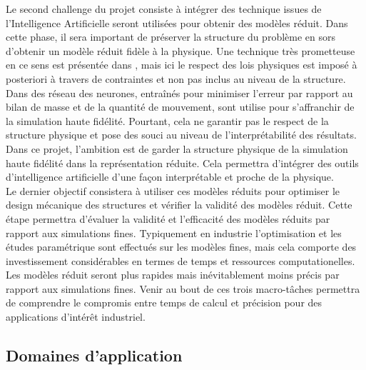 \documentclass[french]{article}
\begin{document}
Le second challenge du projet consiste à intégrer des technique issues de l'Intelligence Artificielle seront utilisées pour obtenir des modèles réduit. Dans cette phase, il sera important de préserver la structure du problème en sors d'obtenir un modèle réduit fidèle à la physique. Une technique très prometteuse en ce sens est présentée dans \cite{lee2020}, mais ici le respect des lois physiques est imposé à posteriori à travers de contraintes et non pas inclus au niveau de la structure. Dans \cite{sun2020physics} des réseau des neurones, entraînés pour minimiser l'erreur par rapport au bilan de masse et de la quantité de mouvement, sont utilise pour s'affranchir de la simulation haute fidélité. Pourtant, cela ne garantir pas le respect de la structure physique et pose des souci au niveau de l'interprétabilité des résultats. Dans ce projet, l'ambition est de garder la structure physique de la simulation haute fidélité dans la représentation réduite. Cela permettra d'intégrer des outils d'intelligence artificielle d'une façon interprétable et proche de la physique. \\

Le dernier objectif consistera \`a utiliser ces modèles réduits pour optimiser le design mécanique des structures et vérifier la validité des modèles réduit.  Cette étape permettra d'évaluer la validité et l'efficacit\'e des modèles réduits par rapport aux simulations fines. Typiquement en industrie l'optimisation et les études paramétrique sont effectués sur les modèles fines, mais cela comporte des investissement considérables en termes de temps et ressources computationelles. Les modèles réduit seront plus rapides mais inévitablement moins précis par rapport aux simulations fines. Venir au bout de ces trois macro-tâches permettra de comprendre le compromis entre temps de calcul et précision pour des applications d'intérêt industriel. 

\subsection{Domaines d'application}
\end{document}
